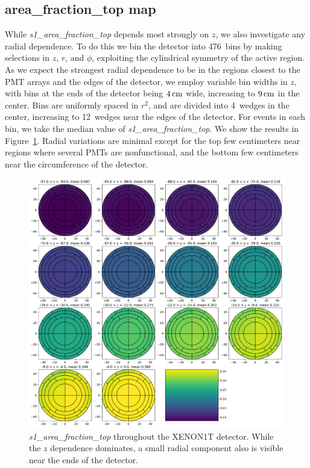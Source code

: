 \subsection{area\_fraction\_top map}

While \textit{s1\_area\_fraction\_top} depends most strongly on $z$, we also investigate any radial dependence. To do this we bin the detector into 476~bins by making selections in $z$, $r$, and $\phi$, exploiting the cylindrical symmetry of the active region. As we expect the strongest radial dependence to be in the regions closest to the PMT arrays and the edges of the detector, we employ variable bin widths in $z$, with bins at the ends of the detector being $4\,\mathrm{cm}$ wide, increasing to $9\,\mathrm{cm}$ in the center. Bins are uniformly spaced in $r^2$, and are divided into 4~wedges in the center, increasing to 12~wedges near the edges of the detector. For events in each bin, we take the median value of \textit{s1\_area\_fraction\_top}. We show the results in Figure~\ref{fig:s1_aft_map}. Radial variations are minimal except for the top few centimeters near regions where several PMTs are nonfunctional, and the bottom few centimeters near the circumference of the detector.

\begin{figure}[htpb]
\centering
    \includegraphics[width=\textwidth]{figures/s1aft/s1aft_binned_44}
    \caption{\textit{s1\_area\_fraction\_top} throughout the XENON1T detector. While the $z$ dependence dominates, a small radial component also is visible near the ends of the detector.}\label{fig:s1_aft_map}
\end{figure}

